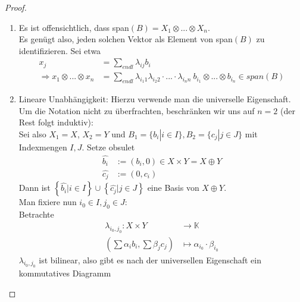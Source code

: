 \documentclass[12pt,a4paper]{article}
\theoremstyle{definition}
\theoremstyle{remark}
\renewcommand{\hat}[1]{\widehat{#1}}
\begin{document}
		\begin{proof}
			\begin{enumerate}
				\item 
					Es ist offensichtlich, dass span$(B) = X_1 \otimes ... \otimes X_n$.  \\
					Es genügt also, jeden solchen Vektor als Element von span$(B)$ zu identifizieren. Sei etwa \\
					\begin{equation}
						\begin{split}
							x_j &= \sum_{endl} \lambda_{ij} b_i \\
							\Rightarrow x_1 \otimes ... \otimes x_n &= \sum_{endl} \lambda_{i_1 1} \lambda_{i_2 2} \cdot ... \cdot \lambda_{i_n n} \ b_{i_1} \otimes ... \otimes b_{i_n} \in span(B)
						\end{split}
					\end{equation}
				\item
					Lineare Unabhängigkeit: Hierzu verwende man die universelle Eigenschaft. Um die Notation nicht zu überfrachten, beschränken wir uns auf $n = 2$ (der Rest folgt induktiv): \\
					Sei also $X_1 = X$, $X_2 = Y$ und $B_1 = \{ b_i | i \in I \}, B_2 = \{ c_j | j \in J \}$ mit Indexmengen $I,J$. Setze obsulet
					\begin{equation}
						\begin{split}
							\hat{b_i} &:= (b_i, 0) \in X \times Y = X \oplus Y \\
							\hat{c_j} &:= (0,c_i) 
						\end{split}
					\end{equation}
					Dann ist $\left\{  \hat{b_i} | i \in I \right\} \cup \left\{ \hat{c_j} | j \in J \right\}$ eine Basis von $X \oplus Y$. \\
					Man fixiere nun $i_0 \in I, j_0 \in J$: \\
					Betrachte
					\begin{equation}
						\begin{split}
							\lambda_{i_0,j_0}: X \times Y &\rightarrow \mathbb{K} \\
							(\sum \alpha_i b_i, \sum \beta_j c_j) &\mapsto \alpha_{i_0} \cdot  \beta_{i_0}
						\end{split}
					\end{equation}
					$\lambda_{i_0,j_0}$ ist bilinear, also gibt es nach der universellen Eigenschaft ein kommutatives Diagramm
					\begin{center}
						\begin{tikzcd}

\end{tikzcd}
\end{center}
\end{enumerate}
\end{proof}
\end{document}
